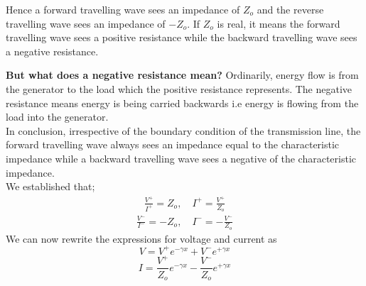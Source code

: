 Hence a forward travelling wave sees an impedance of $Z_o$ and the reverse travelling wave sees an impedance of $-Z_o$. If $Z_o$ is real, it means the forward travelling wave sees a positive resistance while the backward travelling wave sees a negative resistance.

\textbf{But what does a negative resistance mean?}
Ordinarily, energy flow is from the generator to the load which the positive resistance represents. The negative resistance means energy is being carried backwards i.e energy is flowing from the load into the generator.\\

In conclusion, irrespective of the boundary condition of the transmission line, the forward travelling wave always sees an impedance equal to the characteristic impedance while a backward travelling wave sees a negative of the characteristic impedance.\\

We established that;
\begin{align*}
\frac{V^+}{I^+} = Z_o,\quad I^+ = \frac{V^+}{Z_o}
\end{align*}
\begin{align*}
\frac{V^-}{I^-} = -Z_o,\quad I^- = -\frac{V^-}{Z_o}
\end{align*}
We can now rewrite the expressions for voltage and current as
\begin{equation}
V = V^+e^{-\gamma x}+V^-e^{+\gamma x}
\label{eqn:voltage}
\end{equation}
\begin{equation}
I = \frac{V^+}{Z_o}e^{-\gamma x}-\frac{V^-}{Z_o}e^{+\gamma x}
\label{eqn:current}
\end{equation}


